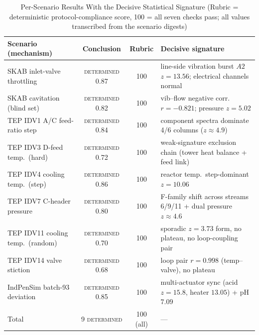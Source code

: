 \documentclass[journal]{IEEEtran}
\begin{document}
\begin{table}[!t]
\caption{Per-Scenario Results With the Decisive Statistical Signature (Rubric = deterministic protocol-compliance score, 100 = all seven checks pass; all values transcribed from the scenario digests)}
\label{tab:mech}
\centering
\footnotesize
\begin{tabular}{lccl}
\toprule
Scenario (mechanism) & Conclusion & Rubric & Decisive signature \\
\midrule
SKAB inlet-valve throttling & \textsc{determined} 0.87 & 100 & line-side vibration burst $A2$ $z{=}13.56$; electrical channels normal \\
SKAB cavitation (blind set) & \textsc{determined} 0.82 & 100 & vib--flow negative corr.\ $r{=}{-}0.821$; pressure $z{=}5.02$ \\
TEP IDV1 A/C feed-ratio step & \textsc{determined} 0.84 & 100 & component spectra dominate 4/6 columns ($z{\approx}4.9$) \\
TEP IDV3 D-feed temp.\ (hard) & \textsc{determined} 0.72 & 100 & weak-signature exclusion chain (tower heat balance + feed link) \\
TEP IDV4 cooling temp.\ (step) & \textsc{determined} 0.86 & 100 & reactor temp.\ step-dominant $z{=}10.06$ \\
TEP IDV7 C-header pressure & \textsc{determined} 0.80 & 100 & F-family shift across streams 6/9/11 + dual pressure $z{\approx}4.6$ \\
TEP IDV11 cooling temp.\ (random) & \textsc{determined} 0.70 & 100 & sporadic $z{=}3.73$ form, no plateau, no loop-coupling pair \\
TEP IDV14 valve stiction & \textsc{determined} 0.68 & 100 & loop pair $r{=}0.998$ (temp--valve), no plateau \\
IndPenSim batch-93 deviation & \textsc{determined} 0.85 & 100 & multi-actuator sync (acid $z{=}15.8$, heater $13.05$) + pH $7.09$ \\
\midrule
Total & 9 \textsc{determined} & 100 (all) & --- \\
\bottomrule
\end{tabular}
\end{table}
\end{document}

